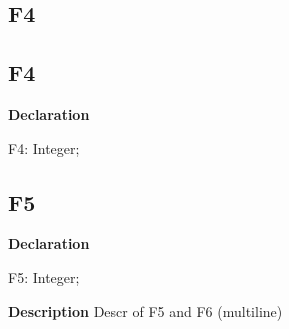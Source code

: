 \documentclass{report}
\newif\ifpdf
\begin{document}
\subsection*{\large{\textbf{F4}}\normalsize\hspace{1ex}\hrulefill}
\else
\subsection*{F4}
\fi
\label{ok_multiple_fields-F4}
\begin{list}{}{
\setlength{\itemindent}{0cm}
\setlength{\listparindent}{0cm}
\setlength{\leftmargin}{\evensidemargin}
\addtolength{\leftmargin}{\tmplength}
\settowidth{\labelsep}{X}
\addtolength{\leftmargin}{\labelsep}
\setlength{\labelwidth}{\tmplength}
}
\item[\textbf{Declaration}\hfill]
\ifpdf
\begin{flushleft}
\fi
\begin{ttfamily}
F4: Integer;\end{ttfamily}

\ifpdf
\end{flushleft}
\fi

\end{list}
\ifpdf
\subsection*{\large{\textbf{F5}}\normalsize\hspace{1ex}\hrulefill}
\else
\subsection*{F5}
\fi
\label{ok_multiple_fields-F5}
\begin{list}{}{
\setlength{\itemindent}{0cm}
\setlength{\listparindent}{0cm}
\setlength{\leftmargin}{\evensidemargin}
\addtolength{\leftmargin}{\tmplength}
\settowidth{\labelsep}{X}
\addtolength{\leftmargin}{\labelsep}
\setlength{\labelwidth}{\tmplength}
}
\item[\textbf{Declaration}\hfill]
\ifpdf
\begin{flushleft}
\fi
\begin{ttfamily}
F5: Integer;\end{ttfamily}

\ifpdf
\end{flushleft}
\fi

\par
\item[\textbf{Description}]
Descr of F5 and F6 (multiline)

\end{list}
\ifpdf
\end{document}
